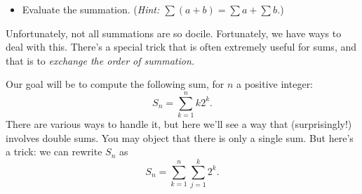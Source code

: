 \documentclass[12pt]{article}
\begin{document}
\begin{itemize}
\item Evaluate the summation. (\textit{Hint: $\sum(a+b)=\sum a + \sum b$.})

\end{itemize}

Unfortunately, not all summations are so docile. Fortunately, we have
ways to deal with this. There's a special trick that is often
extremely useful for sums, and that is to \emph{exchange the order of
  summation.}  


        Our goal will be to compute the following sum, for $n$ a positive integer:
        \[ S_n = \sum_{k=1}^n k2^k. \]
    There are various ways to handle it, but here we'll see a way that (surprisingly!) involves double sums. You may object that there is only a single sum. But here's a trick: we can rewrite $S_n$ as
    \[ S_n = \sum_{k=1}^n \sum_{j=1}^k 2^k. \]
\end{document}

